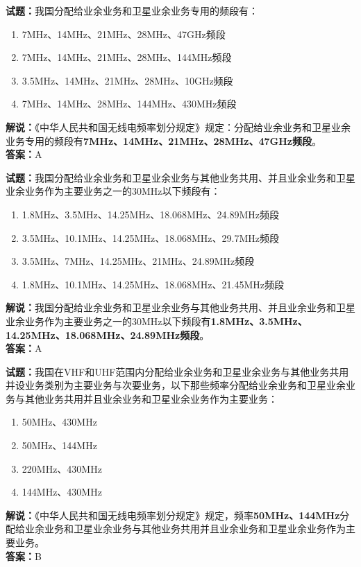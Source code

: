 \documentclass{ctexbook}
\begin{document}
\bigskip




\noindent\textbf{试题：}我国分配给业余业务和卫星业余业务专用的频段有：
\begin{enumerate}[leftmargin=3em]
\item 7\unit{\MHz}、14\unit{\MHz}、21\unit{\MHz}、28\unit{\MHz}、47\unit{\GHz}频段
\item 7\unit{\MHz}、14\unit{\MHz}、21\unit{\MHz}、28\unit{\MHz}、144\unit{\MHz}频段
\item 3.5\unit{\MHz}、14\unit{\MHz}、21\unit{\MHz}、28\unit{\MHz}、10\unit{\GHz}频段
\item 7\unit{\MHz}、14\unit{\MHz}、28\unit{\MHz}、144\unit{\MHz}、430\unit{\MHz}频段
\end{enumerate}
\noindent\textbf{解说：}《中华人民共和国无线电频率划分规定》规定：分配给业余业务和卫星业余业务专用的频段有\textbf{7\unit{\MHz}、14\unit{\MHz}、21\unit{\MHz}、28\unit{\MHz}、47\unit{\GHz}频段}。\\\noindent\textbf{答案：}A
\bigskip




\noindent\textbf{试题：}我国分配给业余业务和卫星业余业务与其他业务共用、并且业余业务和卫星业余业务作为主要业务之一的30\unit{\MHz}以下频段有：
\begin{enumerate}[leftmargin=3em]
\item 1.8\unit{\MHz}、3.5\unit{\MHz}、14.25\unit{\MHz}、18.068\unit{\MHz}、24.89\unit{\MHz}频段
\item 3.5\unit{\MHz}、10.1\unit{\MHz}、14.25\unit{\MHz}、18.068\unit{\MHz}、29.7\unit{\MHz}频段
\item 3.5\unit{\MHz}、7\unit{\MHz}、14.25\unit{\MHz}、21\unit{\MHz}、24.89\unit{\MHz}频段
\item 1.8\unit{\MHz}、10.1\unit{\MHz}、14.25\unit{\MHz}、18.068\unit{\MHz}、21.45\unit{\MHz}频段
\end{enumerate}
\noindent\textbf{解说：}我国分配给业余业务和卫星业余业务与其他业务共用、并且业余业务和卫星业余业务作为主要业务之一的30\unit{\MHz}以下频段有\textbf{1.8\unit{\MHz}、3.5\unit{\MHz}、14.25\unit{\MHz}、18.068\unit{\MHz}、24.89\unit{\MHz}频段}。\\\noindent\textbf{答案：}A
\bigskip




\noindent\textbf{试题：}我国在VHF和UHF范围内分配给业余业务和卫星业余业务与其他业务共用并设业务类别为主要业务与次要业务，以下那些频率分配给业余业务和卫星业余业务与其他业务共用并且业余业务和卫星业余业务作为主要业务：
\begin{enumerate}[leftmargin=3em]
\item 50\unit{\MHz}、430\unit{\MHz}
\item 50\unit{\MHz}、144\unit{\MHz}
\item 220\unit{\MHz}、430\unit{\MHz}
\item 144\unit{\MHz}、430\unit{\MHz}
\end{enumerate}
\noindent\textbf{解说：}《中华人民共和国无线电频率划分规定》规定，频率\textbf{50\unit{\MHz}、144\unit{\MHz}}分配给业余业务和卫星业余业务与其他业务共用并且业余业务和卫星业余业务作为主要业务。\\\noindent\textbf{答案：}B
\end{document}
